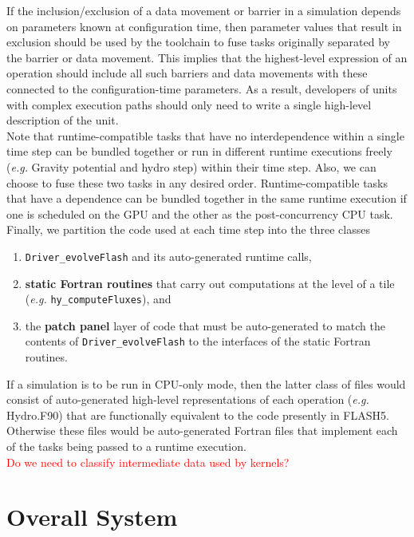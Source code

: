 \documentclass{article}
\begin{document}
If the inclusion/exclusion of a data movement or barrier in a simulation depends
on parameters known at configuration time, then parameter values that result in
exclusion should be used by the toolchain to fuse tasks originally separated by
the barrier or data movement.  This implies that the highest-level expression of
an operation should include all such barriers and data movements with these
connected to the configuration-time parameters.  As a result, developers of
units with complex execution paths should only need to write a single high-level
description of the unit.\\

Note that runtime-compatible tasks that have no interdependence within a single
time step can be bundled together or run in different runtime executions freely
(\textit{e.g.} Gravity potential and hydro step) within their time step.  Also,
we can choose to fuse these two tasks in any desired order.  Runtime-compatible
tasks that have a dependence can be bundled together in the same runtime
execution if one is scheduled on the GPU and the other as the 
post-concurrency CPU task.\\

Finally, we partition the code used at each time step into the three classes
\begin{enumerate}
\item{\texttt{Driver\_evolveFlash} and its auto-generated runtime calls,}
\item{\textbf{static Fortran routines} that carry out computations at the
level of a tile (\textit{e.g.} \texttt{hy\_computeFluxes}), and}
\item{the \textbf{patch panel} layer of code that must be auto-generated to
match the contents of \texttt{Driver\_evolveFlash} to the interfaces of the
static Fortran routines.}
\end{enumerate}
If a simulation is to be run in CPU-only mode, then the latter class of files
would consist of auto-generated high-level representations of each operation
(\textit{e.g.} Hydro.F90) that are functionally equivalent to the code presently
in FLASH5.  Otherwise these files would be auto-generated Fortran files that
implement each of the tasks being passed to a runtime execution.\\

\textcolor{red}{Do we need to classify intermediate data used by kernels?}

\section{Overall System}
\end{document}
